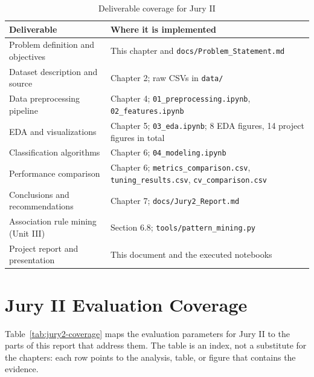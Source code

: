 \begin{table}[H]
    \centering
    \small
    \renewcommand{\arraystretch}{1.25}
    \begin{tabularx}{\textwidth}{|>{\raggedright\arraybackslash}p{4.6cm}|>{\raggedright\arraybackslash}X|}
        \hline
        \textbf{Deliverable} & \textbf{Where it is implemented} \\
        \hline
        Problem definition and objectives & This chapter and \texttt{docs/Problem\_Statement.md} \\
        \hline
        Dataset description and source & Chapter 2; raw CSVs in \texttt{data/} \\
        \hline
        Data preprocessing pipeline & Chapter 4; \texttt{01\_preprocessing.ipynb}, \texttt{02\_features.ipynb} \\
        \hline
        EDA and visualizations & Chapter 5; \texttt{03\_eda.ipynb}; 8 EDA figures, 14 project figures in total \\
        \hline
        Classification algorithms & Chapter 6; \texttt{04\_modeling.ipynb} \\
        \hline
        Performance comparison & Chapter 6; \texttt{metrics\_comparison.csv}, \texttt{tuning\_results.csv}, \texttt{cv\_comparison.csv} \\
        \hline
        Conclusions and recommendations & Chapter 7; \texttt{docs/Jury2\_Report.md} \\
        \hline
        Association rule mining (Unit III) & Section 6.8; \texttt{tools/pattern\_mining.py} \\
        \hline
        Project report and presentation & This document and the executed notebooks \\
        \hline
    \end{tabularx}
    \caption{Deliverable coverage for Jury II}
    \label{tab:deliverables}
\end{table}

\section{Jury II Evaluation Coverage}
\label{sec:evaluation-coverage}

Table~\ref{tab:jury2-coverage} maps the evaluation parameters for Jury II to the parts of this report that address them. The table is an index, not a substitute for the chapters: each row points to the analysis, table, or figure that contains the evidence.

